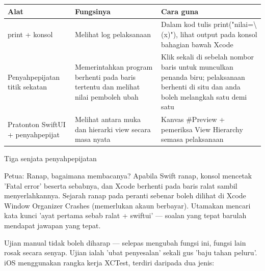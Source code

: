 


\begin{center}
\begin{tabularx}{\linewidth}{|X|X|X|}
\hline
\textbf{Alat} & \textbf{Fungsinya} & \textbf{Cara guna} \tabularnewline
\hline
print + konsol & Melihat log pelaksanaan & Dalam kod tulis print("nilai=\textbackslash{}(x)"), lihat output pada konsol bahagian bawah Xcode \tabularnewline
Penyahpepijatan titik sekatan & Memerintahkan program berhenti pada baris tertentu dan melihat nilai pemboleh ubah & Klik sekali di sebelah nombor baris untuk munculkan penanda biru; pelaksanaan berhenti di situ dan anda boleh melangkah satu demi satu \tabularnewline
Pratonton SwiftUI + penyahpepijat & Melihat antara muka dan hierarki view secara masa nyata & Kanvas \#Preview + pemeriksa View Hierarchy semasa pelaksanaan \tabularnewline
\hline
\end{tabularx}
\end{center}

\begin{center}\small\color{gray}Tiga senjata penyahpepijatan\end{center}

\begin{tcbinfo}{Petua: Ranap, bagaimana membacanya?}
Apabila Swift ranap, konsol mencetak 'Fatal error' beserta sebabnya, dan Xcode berhenti pada baris ralat sambil menyerlahkannya. Sejarah ranap pada peranti sebenar boleh dilihat di Xcode Window Organizer Crashes (memerlukan akaun berbayar). Utamakan mencari kata kunci 'ayat pertama sebab ralat + swiftui' — soalan yang tepat barulah mendapat jawapan yang tepat.

\end{tcbinfo}


Ujian manual tidak boleh diharap — selepas mengubah fungsi ini, fungsi lain rosak secara senyap. Ujian ialah 'ubat penyesalan' sekali gus 'baju tahan peluru'. iOS menggunakan rangka kerja XCTest, terdiri daripada dua jenis:

